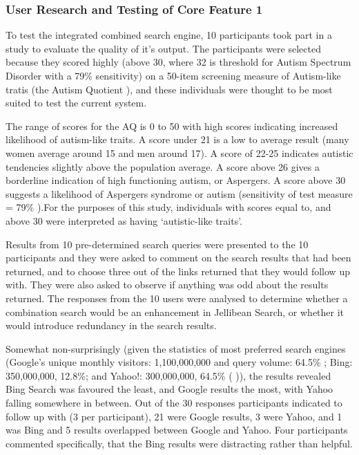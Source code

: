 \documentclass[a4paper, 11pt]{article}
\begin{document}
\subsubsection{User Research and Testing of Core Feature 1}
To test the integrated combined search engine, 10 participants took part in a study to evaluate the quality of it's output. The participants were selected because they scored highly (above 30, where 32 is threshold for Autism Spectrum Disorder with a 79\% sensitivity) on a 50-item screening measure of Autism-like tratis (the Autism Quotient \cite{Baron Cohen et al}), and these individuals were thought to be most suited to test the current system. 

\vspace{5mm}
The range of scores for the AQ is 0 to 50 with high scores indicating increased likelihood of autism-like traits. A score under 21 is a low to average result (many women average around 15 and men around 17). A score of 22-25 indicates autistic tendencies slightly above the population average. A score above 26 gives a borderline indication of high functioning autism, or Aspergers. A score above 30 suggests a likelihood of Aspergers syndrome or autism (sensitivity of test measure = 79\% \cite{Baron Cohen et al}).For the purposes of this study, individuals with scores equal to, and above 30 were interpreted as having `autistic-like traits'.

\vspace{5mm}
Results from 10 pre-determined search queries were presented to the 10 participants and they were asked to comment on the search results that had been returned, and to choose three out of the links returned that they would follow up with. They were also asked to observe if anything was odd about the results returned. The responses from the 10 users were analysed to determine whether a combination search would be an enhancement in Jellibean Search, or whether it would introduce redundancy in the search results. 

\vspace{5mm}
Somewhat non-surprisingly (given the statistics of most preferred search engines (Google's unique monthly visitors: 1,100,000,000 and query
volume: 64.5\% ; Bing: 350,000,000, 12.8\%; and Yahoo!: 300,000,000, 64.5\% (\cite{ebiz} \cite{adam})), the results revealed Bing Search was favoured the least, and Google results the most, with Yahoo falling somewhere in between. Out of the 30 responses participants indicated to follow up with (3 per participant), 21 were Google results, 3 were Yahoo, and 1 was Bing and 5 results overlapped between Google and Yahoo. Four participants commented specifically, that the Bing results were distracting rather than helpful.
\end{document}

